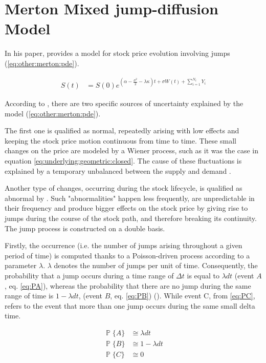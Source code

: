 \documentclass[12pt,a4paper]{report}
\newcommand{\Bm}{W\left(t\right)}
\newcommand{\St}{S\left(t\right)}
\begin{document}
\section{Merton Mixed jump-diffusion Model}
\label{sec:other:merton}

In his paper, \citet{merton76} provides a model for stock price evolution involving jumps (\cref{eq:other:merton:pde}). 


\begin{align}
  \St &= S\left(0\right) e^{\left(\alpha - \frac{\sigma^2}{2} - \lambda \kappa\right) t + \sigma \Bm + \sum_{i=1}^{N_t} Y_i}
  \label{eq:other:merton:pde}
\end{align}
  
According to \citet{merton76}, there are two specific sources of uncertainty explained by the model (\cref{eq:other:merton:pde}). 

The first one is qualified as normal, repeatedly arising with low effects and keeping the stock price motion continuous from time to time. These small changes on the price are modeled by a Wiener process, such as it was the case in equation \ref{eq:underlying:geometric:closed}. The cause of these fluctuations is explained by a temporary unbalanced between the supply and demand \citet{merton76}.

Another type of changes, occurring during the stock lifecycle, is qualified as abnormal by \citet{merton76}. 
Such "abnormalities" happen less frequently, are unpredictable in their frequency and produce bigger effects on the stock price by giving rise to jumps during the course of the stock path, and therefore breaking its continuity. The jump process is constructed on a double basis. 

Firstly, the occurrence (i.e. the number of jumps arising throughout a given period of time) is computed thanks to a Poisson-driven process according to a parameter $\lambda$. 
$\lambda$ denotes the number of jumps per unit of time. Consequently, the probability that a jump occurs during a time range of $\Delta t$ is equal to $\lambda dt$ (event $A$, eq. \ref{eq:PA}), whereas the probability that there are no jump during the same range of time is $1 - \lambda dt$, (event $B$, eq. \ref{eq:PB}) (\citet{matsuda2004}). While event C, from \cref{eq:PC}, refers to the event that more than one jump occurs during the same small delta time.

\begin{align}
  \mathop{\mathbb{P}} \{A\}&\cong \lambda dt  \label{eq:PA}\\
  \mathop{\mathbb{P}} \{B\}&\cong 1 - \lambda dt  \label{eq:PB}\\
  \mathop{\mathbb{P}} \{C\}&\cong   0 \label{eq:PC}
\end{align}
\end{document}
